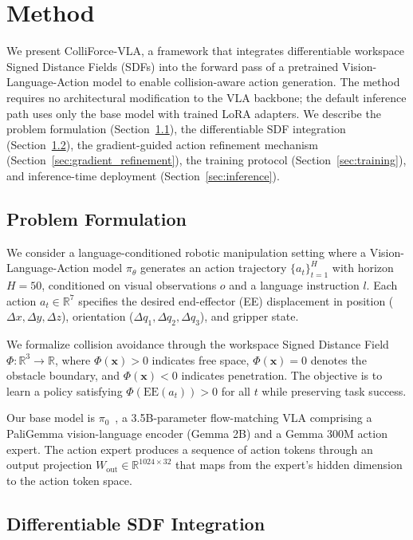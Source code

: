 \section{Method}\label{sec:method}

We present ColliForce-VLA, a framework that integrates differentiable workspace Signed Distance Fields (SDFs) into the forward pass of a pretrained Vision-Language-Action model to enable collision-aware action generation. The method requires no architectural modification to the VLA backbone; the default inference path uses only the base model with trained LoRA adapters. We describe the problem formulation (Section~\ref{sec:problem}), the differentiable SDF integration (Section~\ref{sec:sdf_integration}), the gradient-guided action refinement mechanism (Section~\ref{sec:gradient_refinement}), the training protocol (Section~\ref{sec:training}), and inference-time deployment (Section~\ref{sec:inference}).

\subsection{Problem Formulation}\label{sec:problem}

We consider a language-conditioned robotic manipulation setting where a Vision-Language-Action model $\pi_\theta$ generates an action trajectory $\{a_t\}_{t=1}^{H}$ with horizon $H = 50$, conditioned on visual observations $o$ and a language instruction $l$. Each action $a_t \in \mathbb{R}^7$ specifies the desired end-effector (EE) displacement in position ($\Delta x, \Delta y, \Delta z$), orientation ($\Delta q_1, \Delta q_2, \Delta q_3$), and gripper state.

We formalize collision avoidance through the workspace Signed Distance Field $\Phi: \mathbb{R}^3 \to \mathbb{R}$, where $\Phi(\mathbf{x}) > 0$ indicates free space, $\Phi(\mathbf{x}) = 0$ denotes the obstacle boundary, and $\Phi(\mathbf{x}) < 0$ indicates penetration. The objective is to learn a policy satisfying $\Phi(\mathrm{EE}(a_t)) > 0$ for all $t$ while preserving task success.

Our base model is $\pi_0$~\cite{black2024pi0}, a 3.5B-parameter flow-matching VLA comprising a PaliGemma vision-language encoder (Gemma 2B) and a Gemma 300M action expert. The action expert produces a sequence of action tokens through an output projection $W_{\mathrm{out}} \in \mathbb{R}^{1024 \times 32}$ that maps from the expert's hidden dimension to the action token space.

\subsection{Differentiable SDF Integration}\label{sec:sdf_integration}

